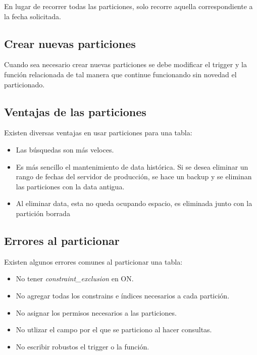 En lugar de recorrer todas las particiones, solo recorre aquella correspondiente a la fecha solicitada.

\subsection{Crear nuevas particiones}

Cuando sea necesario crear nuevas particiones se debe modificar el trigger y la función relacionada de tal manera que continue funcionando sin novedad el particionado.

\subsection{Ventajas de las particiones}

Existen diversas ventajas en usar particiones para una tabla:

\begin{itemize}
\item Las búsquedas son más veloces.
\item Es más sencillo el mantenimiento de data histórica. Si se desea eliminar un rango de fechas del servidor de producción, se hace un backup y se eliminan las particiones con la data antigua.
\item Al eliminar data, esta no queda ocupando espacio, es eliminada junto con la partición borrada
\end{itemize}

\subsection{Errores al particionar}

Existen algunos errores comunes al particionar una tabla:

\begin{itemize}
\item No tener \textit{constraint\_exclusion} en ON.
\item No agregar todas los constrains e índices necesarios a cada partición.
\item No asignar los permisos necesarios a las particiones.
\item No utlizar el campo por el que se particiono al hacer consultas.
\item No escribir robustos el trigger o la función.
\end{itemize}

